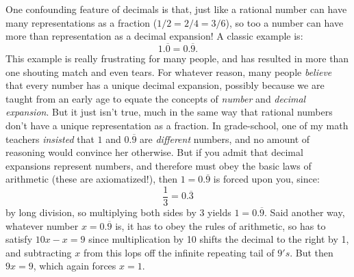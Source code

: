 \documentclass[11pt,oneside]{amsart}
\begin{document}
One confounding feature of decimals is that, just like a rational number can have many representations as a fraction ($1/2 = 2/4 = 3/6$),
so too a number can have more than representation as a decimal expansion!  A classic example is:
\[
  1.\overline{0} = 0.\overline{9}.
\]
This example is really frustrating for many people, and has resulted in more than one shouting match and even tears. 
For whatever reason, many people {\em believe} that every number has a unique decimal expansion, possibly because
we are taught from an early age to equate the concepts of {\em number} and {\em decimal expansion}.  But it just isn't true,
much in the same way that rational numbers don't have a unique representation as a fraction.  In grade-school, one of my math teachers
{\em insisted} that $1$ and $0.\overline{9}$ are {\em different} numbers, and no amount of reasoning would convince her otherwise.  But if you
admit that decimal expansions represent numbers, and therefore must obey the basic laws of arithmetic (these are axiomatized!), then
$1=0.\overline{9}$ is forced upon you, since:
\[
\frac{1}{3} = 0.\overline{3}
\]
by long division, so multiplying both sides by 3 yields $1=0.\overline{9}$.  
Said another way, whatever number $x=0.\overline{9}$
is, it has to obey the rules of arithmetic, so has to satisfy $10x - x = 9$ since multiplication by 10 shifts the decimal to the right by 1, 
and subtracting $x$ from this lops off the infinite repeating tail of $9's$.  But then $9x=9$, which again forces $x=1$.
\end{document}
